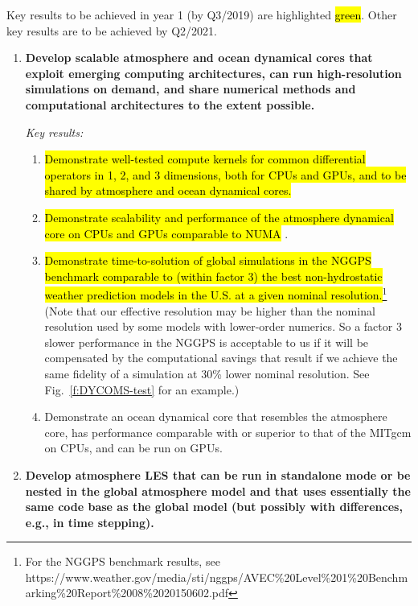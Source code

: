 \documentclass{article}
\newcommand{\hlg}[1]{{\sethlcolor{green}\hl{#1}}}
\begin{document}
Key results to be achieved in year 1 (by Q3/2019) are highlighted \hlg{green}. Other key results are to be achieved by Q2/2021.    
\begin{enumerate}
    \item \textbf{Develop scalable atmosphere and ocean dynamical cores that exploit emerging computing architectures, can run high-resolution simulations on demand, and share numerical methods and computational architectures to the extent possible.}
        
    \emph{Key results:}
    \begin{enumerate}
        \item \hlg{Demonstrate well-tested compute kernels for common differential operators in 1, 2, and 3 dimensions, both for CPUs and GPUs, and to be shared by atmosphere and ocean dynamical cores.}
        \item \hlg{Demonstrate scalability and performance of the atmosphere dynamical core on CPUs and GPUs comparable to NUMA} \citep{abdi:2016b,abdi:2018,mueller:2016}. 
        \item \hlg{Demonstrate time-to-solution of global simulations in the  NGGPS benchmark comparable to (within factor 3) the best non-hydrostatic weather prediction models in the U.S. at a given nominal resolution.}\footnote{For the NGGPS benchmark results, see https://www.weather.gov/media/sti/nggps/AVEC\%20Level\%201\%20Benchmarking\%20Report\%2008\%2020150602.pdf} (Note that our effective resolution may be higher than the nominal resolution used by some models with lower-order numerics. So a factor 3 slower performance in the NGGPS is acceptable to us if it will be compensated by the computational savings that result if we achieve the same fidelity of a simulation at 30\% lower nominal resolution. See Fig.~\ref{f:DYCOMS-test} for an example.)
        \item Demonstrate an ocean dynamical core that resembles the atmosphere core, has performance comparable with or superior to that of the MITgcm on CPUs, and can be run on GPUs.
    \end{enumerate}
 
 \item \textbf{Develop atmosphere LES that can be run in standalone mode or be nested in the global atmosphere model and that uses essentially the same code base as the global model (but possibly with differences, e.g., in time stepping).}
 

\end{enumerate}
\end{document}
